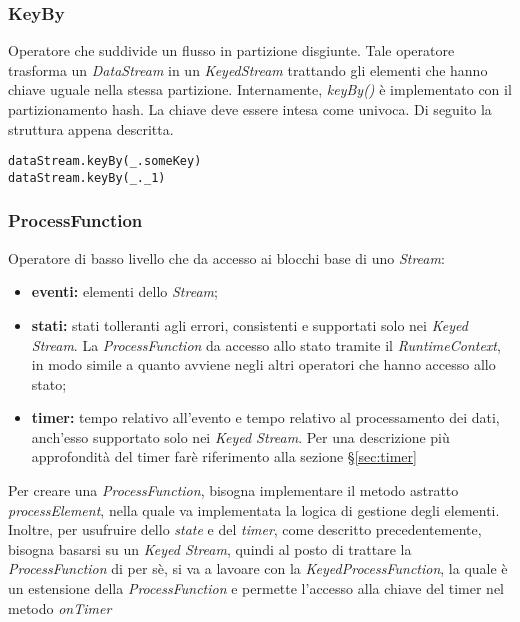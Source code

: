 \subsubsection{KeyBy}
Operatore che suddivide un flusso in partizione disgiunte. Tale operatore trasforma un \textit{DataStream} in un \textit{KeyedStream} trattando gli elementi che hanno chiave uguale nella stessa partizione. Internamente, \textit{keyBy()} è implementato con il partizionamento hash.
La chiave deve essere intesa come univoca.
Di seguito la struttura appena descritta.
\begin{verbatim}
dataStream.keyBy(_.someKey)
dataStream.keyBy(_._1)
\end{verbatim}

\subsubsection{ProcessFunction}
Operatore di basso livello che da accesso ai blocchi base di uno \textit{Stream}:
\begin{itemize}
	\item{\textbf{eventi:} elementi dello \textit{Stream};}
	\item{\textbf{stati:} stati tolleranti agli errori, consistenti e supportati solo nei \textit{Keyed Stream}. La \textit{ProcessFunction} da accesso allo stato tramite il \textit{RuntimeContext}, in modo simile a quanto avviene negli altri operatori che hanno accesso allo stato;}
	\item{\textbf{timer:} tempo relativo all'evento e tempo relativo al processamento dei dati, anch'esso supportato solo nei \textit{Keyed Stream}}. Per una descrizione più approfondità del timer farè riferimento alla sezione \S\ref{sec:timer}
\end{itemize}

Per creare una \textit{ProcessFunction}, bisogna implementare il metodo astratto \textit{processElement}, nella quale va implementata la logica di gestione degli elementi. Inoltre, per usufruire dello \textit{state} e del \textit{timer}, come descritto precedentemente, bisogna basarsi su un \textit{Keyed Stream}, quindi al posto di trattare la \textit{ProcessFunction} di per sè, si va a lavoare con la \textit{KeyedProcessFunction}, la quale è un estensione della \textit{ProcessFunction} e permette l'accesso alla chiave del timer nel metodo \textit{onTimer} 

